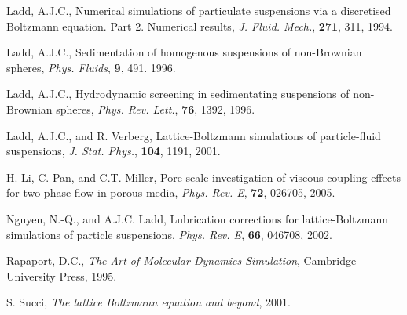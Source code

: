 \begin{thebibliography}{99}
Ladd, A.J.C., Numerical simulations of particulate suspensions
via a discretised Boltzmann equation. Part 2. Numerical results,
\textit{J. Fluid. Mech.}, \textbf{271}, 311, 1994.

Ladd, A.J.C., Sedimentation of homogenous suspensions of non-Brownian
spheres,
\textit{Phys. Fluids}, \textbf{9}, 491. 1996.

Ladd, A.J.C., Hydrodynamic screening in sedimentating suspensions
of non-Brownian spheres,
\textit{Phys. Rev. Lett.}, \textbf{76}, 1392, 1996.

Ladd, A.J.C., and R. Verberg,
Lattice-Boltzmann simulations of particle-fluid suspensions,
\textit{J. Stat. Phys.}, \textbf{104}, 1191, 2001.

H. Li, C. Pan, and C.T. Miller,
Pore-scale investigation of viscous coupling effects for two-phase
flow in porous media,
\textit{Phys. Rev. E}, \textbf{72}, 026705, 2005.

Nguyen, N.-Q., and A.J.C. Ladd, Lubrication corrections for
lattice-Boltzmann simulations of particle suspensions,
\textit{Phys. Rev. E}, \textbf{66}, 046708, 2002.

Rapaport, D.C., \textit{The Art of Molecular Dynamics Simulation},
Cambridge University Press, 1995.

S. Succi, \textit{The lattice Boltzmann equation and beyond},
2001.



\end{thebibliography}




